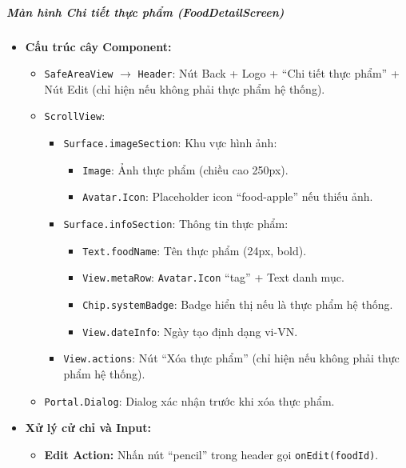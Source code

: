 \subparagraph{Màn hình Chi tiết thực phẩm (FoodDetailScreen)}
\begin{itemize}
    \item \textbf{Cấu trúc cây Component:}
        \begin{itemize}
            \item \texttt{SafeAreaView} $\rightarrow$ \texttt{Header}: Nút Back + Logo + ``Chi tiết thực phẩm'' + Nút Edit (chỉ hiện nếu không phải thực phẩm hệ thống).
            \item \texttt{ScrollView}:
                \begin{itemize}
                    \item \texttt{Surface.imageSection}: Khu vực hình ảnh:
                        \begin{itemize}
                            \item \texttt{Image}: Ảnh thực phẩm (chiều cao 250px).
                            \item \texttt{Avatar.Icon}: Placeholder icon ``food-apple'' nếu thiếu ảnh.
                        \end{itemize}
                    \item \texttt{Surface.infoSection}: Thông tin thực phẩm:
                        \begin{itemize}
                            \item \texttt{Text.foodName}: Tên thực phẩm (24px, bold).
                            \item \texttt{View.metaRow}: \texttt{Avatar.Icon} ``tag'' + Text danh mục.
                            \item \texttt{Chip.systemBadge}: Badge hiển thị nếu là thực phẩm hệ thống.
                            \item \texttt{View.dateInfo}: Ngày tạo định dạng vi-VN.
                        \end{itemize}
                    \item \texttt{View.actions}: Nút ``Xóa thực phẩm'' (chỉ hiện nếu không phải thực phẩm hệ thống).
                \end{itemize}
            \item \texttt{Portal.Dialog}: Dialog xác nhận trước khi xóa thực phẩm.
        \end{itemize}
    \item \textbf{Xử lý cử chỉ và Input:}
        \begin{itemize}
            \item \textbf{Edit Action:} Nhấn nút ``pencil'' trong header gọi \texttt{onEdit(foodId)}.

\end{itemize}
\end{itemize}
